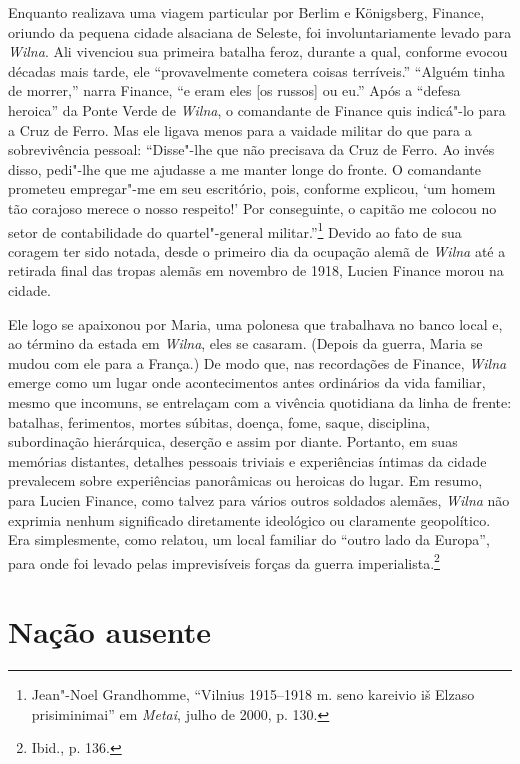 Enquanto realizava uma viagem particular por Berlim e Königsberg,
Finance, oriundo da pequena cidade alsaciana de Seleste, foi
involuntariamente levado para \textit{Wilna}. Ali vivenciou sua primeira batalha
feroz, durante a qual, conforme evocou décadas mais tarde, ele
``provavelmente cometera coisas terríveis.'' ``Alguém tinha de morrer,''
narra Finance, ``e eram eles {[}os russos{]} ou eu.'' Após a ``defesa
heroica'' da Ponte Verde de \textit{Wilna}, o comandante de Finance quis
indicá"-lo para a Cruz de Ferro. Mas ele ligava menos para a vaidade
militar do que para a sobrevivência pessoal: ``Disse"-lhe que não
precisava da Cruz de Ferro. Ao invés disso, pedi"-lhe que me ajudasse a
me manter longe do fronte. O comandante prometeu empregar"-me em seu
escritório, pois, conforme explicou, `um homem tão corajoso merece o
nosso respeito!' Por conseguinte, o capitão me colocou no setor de
contabilidade do quartel"-general militar.''\footnote{Jean"-Noel Grandhomme, ``Vilnius 1915--1918 m. seno kareivio iš Elzaso prisiminimai'' em \textit{Metai}, julho de 2000, p. 130.} Devido ao fato de sua coragem ter sido notada, desde o primeiro dia da ocupação alemã
de \textit{Wilna} até a retirada final das tropas alemãs em novembro de 1918,
Lucien Finance morou na cidade.

Ele logo se apaixonou por Maria, uma polonesa que trabalhava no banco
local e, ao término da estada em \textit{Wilna}, eles se casaram. (Depois da
guerra, Maria se mudou com ele para a França.) De modo que, nas
recordações de Finance, \textit{Wilna} emerge como um lugar onde acontecimentos
antes ordinários da vida familiar, mesmo que incomuns, se entrelaçam com
a vivência quotidiana da linha de frente: batalhas, ferimentos, mortes
súbitas, doença, fome, saque, disciplina, subordinação hierárquica,
deserção e assim por diante. Portanto, em suas memórias distantes,
detalhes pessoais triviais e experiências íntimas da cidade prevalecem
sobre experiências panorâmicas ou heroicas do lugar. Em resumo, para
Lucien Finance, como talvez para vários outros soldados alemães, \textit{Wilna}
não exprimia nenhum significado diretamente ideológico ou claramente
geopolítico. Era simplesmente, como relatou, um local familiar do
``outro lado da Europa'', para onde foi levado pelas imprevisíveis
forças da guerra imperialista.\footnote{Ibid., p. 136.}

%

\chapter{Nação ausente}

